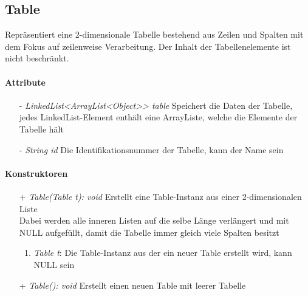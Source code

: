 \subsection{Table}

Repräsentiert eine 2-dimensionale Tabelle bestehend aus Zeilen und Spalten mit dem Fokus auf zeilenweise Verarbeitung. Der Inhalt der Tabellenelemente ist nicht beschränkt.


\paragraph{Attribute}

\begin{itemize}
	\item[-] \textit{LinkedList<ArrayList<Object>> table} Speichert die Daten der Tabelle, jedes LinkedList-Element enthält eine ArrayListe, welche die Elemente der Tabelle hält
	\item[-] \textit{String id}	Die Identifikationsnummer der Tabelle, kann der Name sein
\end{itemize}

\paragraph{Konstruktoren}

\begin{itemize}
	\item[+] \textit{Table(Table t): void} Erstellt eine Table-Instanz aus einer 2-dimensionalen Liste \\
	Dabei werden alle inneren Listen auf die selbe Länge verlängert und mit NULL aufgefüllt, damit die Tabelle immer gleich viele Spalten besitzt
	\begin{enumerate}
		\item \textit{Table t}: Die Table-Instanz aus der ein neuer Table erstellt wird, kann NULL sein
	\end{enumerate}

	\item[+] \textit{Table(): void} Erstellt einen neuen Table mit leerer Tabelle
\end{itemize}
			
